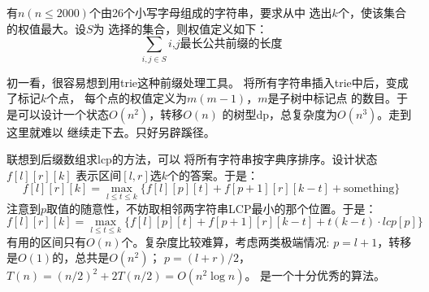 \begin{prob}
	有$n(n \le 2000)$个由26个小写字母组成的字符串，要求从中
	选出$k$个，使该集合的权值最大。设$S$为
	选择的集合，则权值定义如下：
	\begin{displaymath}
		\sum_{i,j \in S} \text{$i$,$j$最长公共前缀的长度}
	\end{displaymath}
\end{prob}

\begin{sol}
	初一看，很容易想到用trie这种前缀处理工具。
	将所有字符串插入trie中后，变成了标记$k$个点，
	每个点的权值定义为$m(m-1)$，$m$是子树中标记点
	的数目。于是可以设计一个状态$O(n^2)$，转移$O(n)$
	的树型dp，总复杂度为$O(n^3)$。走到这里就难以
	继续走下去。只好另辟蹊径。\par
	联想到后缀数组求lcp的方法，可以
	将所有字符串按字典序排序。设计状态$f[l][r][k]$
	表示区间$[l,r]$选$k$个的答案。于是：
	\begin{displaymath}
		f[l][r][k] = \max_{l \le  t \le k}\{ f[l][p][t] + f[p+1][r][k-t] + \text{something}\}
	\end{displaymath}
	注意到$p$取值的随意性，不妨取相邻两字符串LCP最小的那个位置。于是：
	\begin{displaymath}
	f[l][r][k] = \max_{l \le  t \le k}\{ f[l][p][t] + f[p+1][r][k-t] + t(k-t) \cdot lcp[p]\}
\end{displaymath}
有用的区间只有$O(n)$个。复杂度比较难算，考虑两类极端情况:
$p=l+1$，转移是$O(1)$的，总共是$O(n^2)$；
$p=(l+r)/2$，$T(n) = (n/2)^2 + 2T(n/2) = O(n^2 \log n)$。
是一个十分优秀的算法。
\end{sol}
